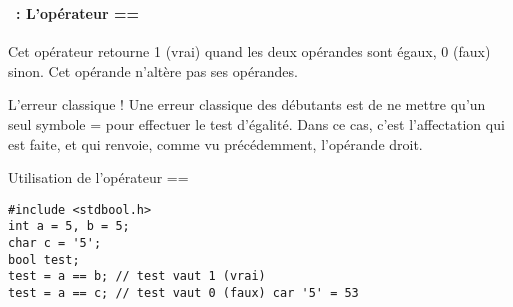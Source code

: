 \begin{frame}[containsverbatim]
  \frametitle{\secname}
  \framesubtitle{\subsecname~: L'opérateur ==} 

  Cet opérateur retourne 1 (vrai) quand les deux opérandes sont égaux, 0 (faux) sinon. Cet opérande n'altère pas ses opérandes.
  \par
  \begin{alertblock}{L'erreur classique !}
    Une erreur classique des débutants est de ne mettre qu'un seul symbole = pour effectuer le test d'égalité. Dans ce cas, c'est l'affectation qui
    est faite, et qui renvoie, comme vu précédemment, l'opérande droit.
  \end{alertblock}
  \begin{exampleblock}{Utilisation de l'opérateur ==}
    \begin{verbatim}
#include <stdbool.h>
int a = 5, b = 5;
char c = '5';
bool test;   
test = a == b; // test vaut 1 (vrai)
test = a == c; // test vaut 0 (faux) car '5' = 53  \end{verbatim}
  \end{exampleblock}
\end{frame}

